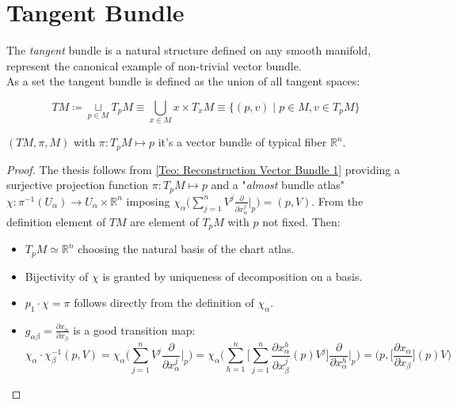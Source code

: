 \documentclass[a4paper,12pt]{scrartcl}    %
\begin{document}
\section{Tangent Bundle}
The \emph{tangent} bundle is a natural structure defined on any smooth manifold, represent the canonical example of  non-trivial vector bundle.
\vspace{6mm}
\\
As a set the tangent bundle is defined as the union of all tangent spaces:
\begin{definition}
\begin{displaymath}
	TM \coloneqq \underset{p \in M}{\sqcup} T_pM 
	\equiv \bigcup_{x\in M} {x}\times T_x M 
	\equiv \{ (p,v) \; \big\vert \; p\in M, v \in T_pM \}
\end{displaymath}
\end{definition}

\begin{corollary}
$ (TM, \pi, M)$ with $\pi: T_p M \mapsto {p}$ it's a vector bundle of typical fiber $\mathbb{R}^n$.
\end{corollary}
\begin{proof}
The thesis follows from \ref{Teo: Reconstruction Vector Bundle 1} providing a surjective projection function $\pi : T_p M \mapsto {p}$ and a "\emph{almost} bundle atlas" $\chi: \pi^{-1} ( U_\alpha) \rightarrow U_\alpha \times \mathbb{R}^n $ imposing $\chi_\alpha \big( \sum_{j=1}^n V^j \frac{\partial}{\partial x_\alpha^j} \big\vert_p \big) = (p,V) $.
From the definition element of $TM$ are element of $T_pM$ with $p$ not fixed. Then:
\begin{itemize}
\item $T_pM \simeq \mathbb{R}^n$ choosing the natural basis of the chart atlas.
\item Bijectivity of $\chi$ is granted by uniqueness of decomposition on a basis.
\item $p_1 \cdot \chi = \pi $ follows directly from the definition of $\chi_\alpha$.
\item $g_{\alpha \beta} = \frac{\partial x_\alpha}{\partial x_\beta}$ is a good transition map:
\begin{displaymath}
\chi_\alpha \cdot \chi_\beta ^{-1} (p,V) = \chi_\alpha \Big( \sum_{j=1}^n V^j \frac{\partial}{\partial x_\alpha^j} \big\vert_p \Big) = \chi_\alpha \Big( \sum_{h=1}^n \Big [ \sum_{j=1}^n \frac{\partial x_\alpha ^h}{\partial x_\beta^j}(p) V^j\Big] \frac{\partial}{\partial x_\alpha^h} \big\vert_p \Big) = \Big( p, \Big[\frac{\partial x_\alpha}{\partial x_\beta}\Big](p) V \Big)
\end{displaymath}
\end{itemize}
\end{proof}
\end{document}
